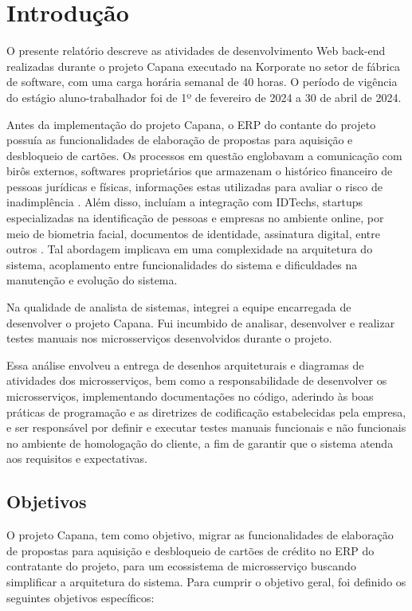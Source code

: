\chapter{Introdução}
\label{Introdução}
O presente relatório descreve as atividades de desenvolvimento Web back-end 
realizadas durante o projeto Capana executado na Korporate no setor de fábrica de 
software, com uma carga horária semanal de 40 horas. O período de vigência do estágio 
aluno-trabalhador foi de 1º de fevereiro de 2024 a 30 de abril de 2024. 

Antes da implementação do projeto Capana, o ERP do contante do projeto possuía as 
funcionalidades de elaboração de propostas para aquisição e desbloqueio de cartões. 
Os processos em questão englobavam a comunicação com birôs externos, softwares proprietários que armazenam o histórico 
financeiro de pessoas jurídicas e físicas, informações estas utilizadas para avaliar o risco de inadimplência 
\cite{biros-credito-explicacao}. Além disso, incluíam a integração com IDTechs, startups especializadas na identificação de pessoas e 
empresas no ambiente online, por meio de biometria facial, documentos de identidade, assinatura digital, 
entre outros \cite{idtechs:explicacao}. 
Tal abordagem implicava em uma complexidade na arquitetura do sistema, acoplamento 
entre funcionalidades do sistema e dificuldades na manutenção e evolução do sistema. 				 

Na qualidade de analista de sistemas, integrei a equipe encarregada de desenvolver o 
projeto Capana. Fui incumbido de analisar, desenvolver e realizar testes manuais nos 
microsserviços desenvolvidos durante o projeto. 					 

Essa análise envolveu a entrega de desenhos arquiteturais e diagramas de atividades 
dos microsserviços, bem como a responsabilidade de desenvolver os microsserviços, implementando 
documentações no código, aderindo às boas práticas de programação e as diretrizes de 
codificação estabelecidas pela empresa, e ser responsável por definir e executar 
testes manuais funcionais e não funcionais no ambiente de homologação do cliente, a 
fim de garantir que o sistema atenda aos requisitos e expectativas.  		

\section{Objetivos}

O projeto Capana, tem como objetivo, migrar as funcionalidades de elaboração de 
propostas para aquisição e desbloqueio de cartões de crédito no ERP do contratante do 
projeto, para um ecossistema de microsserviço buscando simplificar a arquitetura do 
sistema. Para cumprir o objetivo geral, foi definido os seguintes objetivos 
específicos: 	

